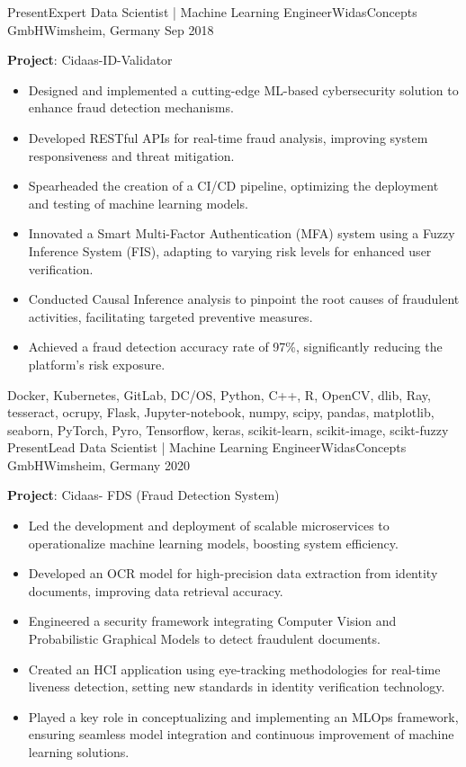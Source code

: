 %
%
%
\begin{experiences}
	\experience
	{Present}{Expert Data Scientist | Machine Learning Engineer}{WidasConcepts GmbH}{Wimsheim, Germany}
	{Sep 2018} {
		\vspace{0.1cm}
		\textbf{Project}: Cidaas-ID-Validator
		\begin{itemize}
    \item Designed and implemented a cutting-edge ML-based cybersecurity solution to enhance fraud detection mechanisms.
\item Developed RESTful APIs for real-time fraud analysis, improving system responsiveness and threat mitigation.
\item Spearheaded the creation of a CI/CD pipeline, optimizing the deployment and testing of machine learning models.
\item Innovated a Smart Multi-Factor Authentication (MFA) system using a Fuzzy Inference System (FIS), adapting to varying risk levels for enhanced user verification.
\item Conducted Causal Inference analysis to pinpoint the root causes of fraudulent activities, facilitating targeted preventive measures.
\item Achieved a fraud detection accuracy rate of 97\%, significantly reducing the platform's risk exposure.

		\end{itemize}
	}
	{Docker, Kubernetes, GitLab, DC/OS, Python, C++, R,  OpenCV, dlib, Ray, tesseract, ocrupy, Flask, Jupyter-notebook, numpy, scipy, pandas, matplotlib, seaborn, PyTorch, Pyro, Tensorflow, keras, scikit-learn, scikit-image, scikt-fuzzy}
	\emptySeparator
	\experience
	{Present}{Lead Data Scientist | Machine Learning Engineer}{WidasConcepts GmbH}{Wimsheim, Germany}
	{2020} {
		\vspace{0.1cm}
		\textbf{Project}: Cidaas- FDS (Fraud Detection System)
		\begin{itemize}
    \item Led the development and deployment of scalable microservices to operationalize machine learning models, boosting system efficiency.
\item Developed an OCR model for high-precision data extraction from identity documents, improving data retrieval accuracy.
\item Engineered a security framework integrating Computer Vision and Probabilistic Graphical Models to detect fraudulent documents.
\item Created an HCI application using eye-tracking methodologies for real-time liveness detection, setting new standards in identity verification technology.
\item Played a key role in conceptualizing and implementing an MLOps framework, ensuring seamless model integration and continuous improvement of machine learning solutions.


\end{itemize}}
\end{experiences}
